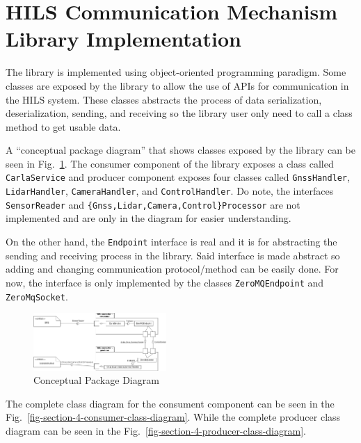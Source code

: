 \section{HILS Communication Mechanism Library Implementation}

The library is implemented using object-oriented programming paradigm. Some
classes are exposed by the library to allow the use of APIs for communication in
the HILS system. These classes abstracts the process of data serialization,
deserialization, sending, and receiving so the library user only need to call a
class method to get usable data.

A ``conceptual package diagram'' that shows classes exposed by the library can
be seen in Fig.~\ref{fig-section-4-conceptual-package-diagram}. The consumer
component of the library exposes a class called \texttt{Car\-la\-Ser\-vice} and
producer component exposes four classes called \texttt{G\-n\-s\-s\-Hand\-ler},
\texttt{Li\-dar\-Hand\-ler}, \texttt{Ca\-me\-ra\-Hand\-ler}, and
\texttt{Con\-trol\-Hand\-ler}. Do note, the interfaces \texttt{SensorReader} and
\texttt{\{Gnss,Lidar,Camera,Control\}Processor} are not implemented and are only
in the diagram for easier understanding.

On the other hand, the \texttt{Endpoint} interface is real and it is for
abstracting the sending and receiving process in the library. Said interface is
made abstract so adding and changing communication protocol/method can be easily
done. For now, the interface is only implemented by the classes
\texttt{ZeroMQEndpoint} and \texttt{ZeroMqSocket}.

\begin{figure}[htbp]
	\centerline{\includegraphics[width=0.45\textwidth]{resources/chapter-4/conceptual-package-diagram.png}}
	\caption{Conceptual Package Diagram}
	\label{fig-section-4-conceptual-package-diagram}
\end{figure}

The complete class diagram for the consument component can be seen in the
Fig.~\ref{fig-section-4-consumer-class-diagram}. While the complete producer class
diagram can be seen in the Fig.~\ref{fig-section-4-producer-class-diagram}.

